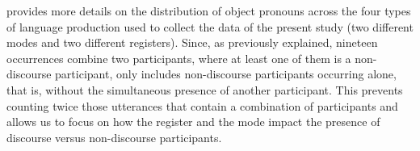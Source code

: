 \documentclass[output=paper]{langscibook}
\begin{document}
\begin{table}
\caption{Distribution of (non)-discourse participants in formal and informal data (raw frequencies (normalized per ten thousand words)). Frequencies (“freq.”) are given twice, as both raw and normalized.}
\label{tab:pierre:5}
\end{table}



 provides more details on the distribution of object pronouns across the four types of language production used to collect the data of the present study (two different modes and two different registers). Since, as previously explained, nineteen occurrences combine two participants, where at least one of them is a non-discourse participant,  only includes non-discourse participants occurring alone, that is, without the simultaneous presence of another participant. This prevents counting twice those utterances that contain a combination of participants and allows us to focus on how the register and the mode impact the presence of discourse versus non-discourse participants.
\end{document}
